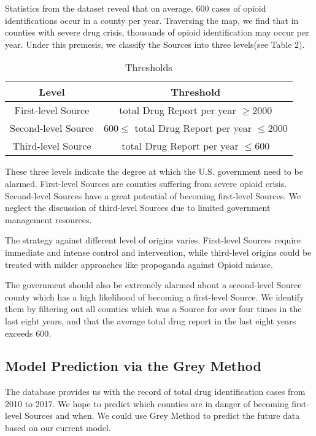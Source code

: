 Statistics from the dataset reveal that on average, 600 cases of opioid identifications occur in a county per year. Traversing the map, we find that in counties with severe drug crisis, thousands of opioid identification may occur per year. Under this premesis, we classify the Sources into three levels(see Table 2).


\begin{table}[H]
	\centering
	\begin{tabular}{|c|c|}
		\hline
		\rowcolor[HTML]{656565} 
		{\color[HTML]{FFFFFF} \textbf{Level}} & {\color[HTML]{FFFFFF} \textbf{Threshold}} \\ \hline
		First-level Source  & total Drug Report per year $\geq 2000$ \\ \hline
		Second-level Source & $600 \leq$ total Drug Report per year $\leq 2000$ \\ \hline
		Third-level Source  & total Drug Report per year $\leq 600$ \\ \hline
	\end{tabular}
	\caption{Thresholds}
\end{table}

These three levels indicate the degree at which the U.S. government need to be alarmed. First-level Sources are counties suffering from severe opioid crisis. Second-level Sources have a great potential of becoming first-level Sources. We neglect the discussion of third-level Sources due to limited government management resources.

The strategy against different level of origins varies. First-level Sources require immediate and intense control and intervention, while third-level origins could be treated with milder approaches like propoganda against Opioid misuse. 

The government should also be extremely alarmed about a second-level Source county which has a high likelihood of becoming a first-level Source. We identify them by filtering out all counties which was a Source for over four times in the last eight years, and that the average total drug report in the last eight years exceeds 600.


\subsection{Model Prediction via the Grey Method}
The database provides us with the record of total drug identification cases from 2010 to 2017. We hope to predict which counties are in danger of becoming first-level Sources and when. We could use Grey Method to predict the future data based on our current model.

